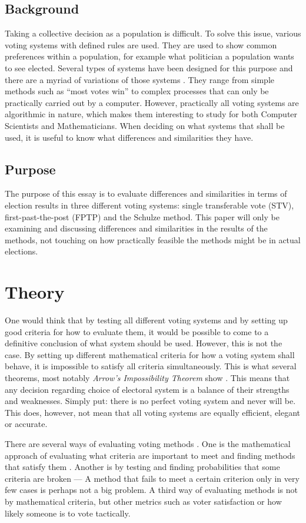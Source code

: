 \documentclass[12pt]{article}
\begin{document}
\subsection{Background}
Taking a collective decision as a population is difficult. To solve this issue, various voting systems with defined rules are used. They are used to show common preferences within a population, for example what politician a population wants to see elected. Several types of systems have been designed for this purpose and there are a myriad of variations of those systems \autocite{fairvoteND}. They range from simple methods such as “most votes win” to complex processes that can only be practically carried out by a computer. However, practically all voting systems are algorithmic in nature, which makes them interesting to study for both Computer Scientists and Mathematicians. When deciding on what systems that shall be used, it is useful to know what differences and similarities they have.
\subsection{Purpose}
The purpose of this essay is to evaluate differences and similarities in terms of election results in three different voting systems: single transferable vote (STV), first-past-the-post (FPTP) and the Schulze method. This paper will only be examining and discussing differences and similarities in the results of the methods, not touching on how practically feasible the methods might be in actual elections.
\section{Theory}
One would think that by testing all different voting systems and by setting up good criteria for how to evaluate them, it would be possible to come to a definitive conclusion of what system should be used. However, this is not the case. By setting up different mathematical criteria for how a voting system shall behave, it is impossible to satisfy all criteria simultaneously. This is what several theorems, most notably \textit{Arrow's Impossibility Theorem} show \autocite{arrow1950difficulty}. This means that any decision regarding choice of electoral system is a balance of their strengths and weaknesses. Simply put: there is no perfect voting system and never will be. This does, however, not mean that all voting systems are equally efficient, elegant or accurate.

There are several ways of evaluating voting methods \autocite{green-armytageND}. One is the mathematical approach of evaluating what criteria are important to meet and finding methods that satisfy them \autocite{woodwall1994}. Another is by testing and finding probabilities that some criteria are broken — A method that fails to meet a certain criterion only in very few cases is perhaps not a big problem. A third way of evaluating methods is not by mathematical criteria, but other metrics such as voter satisfaction or how likely someone is to vote tactically.
\end{document}

